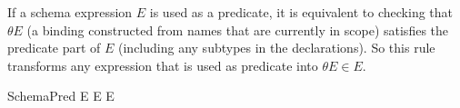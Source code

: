 \documentclass{article}
\begin{document}
If a schema expression $E$ is used as a predicate, it is equivalent to
checking that $\theta E$ (a binding constructed from names that are
currently in scope) satisfies the predicate part of $E$ 
(including any subtypes in the declarations).  So this rule
transforms any expression that is used as predicate into $\theta E \in E$.
\begin{zedrule}{SchemaPred}
  E \iff \theta E \in E
\end{zedrule}


\end{document}
